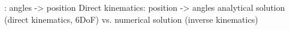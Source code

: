 : angles -> position
Direct kinematics: position -> angles
analytical solution (direct kinematics, 6DoF) vs. numerical solution (inverse kinematics)






